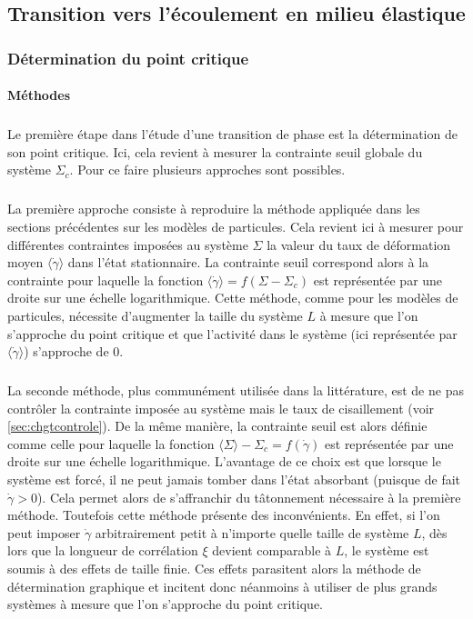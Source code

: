 \subsection{Transition vers l'écoulement en milieu élastique}

\subsubsection{Détermination du point critique}

\label{sec:methodepointcritique}

\paragraph{Méthodes}

\subparagraph{}Le première étape dans l'étude d'une transition de phase est la détermination de son point critique. Ici, cela revient à mesurer la contrainte seuil globale du système $\Sigma_c$. Pour ce faire plusieurs approches sont possibles.

\subparagraph{}La première approche consiste à reproduire la méthode appliquée dans les sections précédentes sur les modèles de particules. Cela revient ici à mesurer pour différentes contraintes imposées au système $\Sigma$ la valeur du taux de déformation moyen $\langle \dot{\gamma}\rangle$ dans l'état stationnaire. La contrainte seuil correspond alors à la contrainte pour laquelle la fonction $\langle \dot{\gamma} \rangle = f(\Sigma-\Sigma_c)$ est représentée par une droite sur une échelle logarithmique. Cette méthode, comme pour les modèles de particules, nécessite d'augmenter la taille du système $L$ à mesure que l'on s'approche du point critique et que l'activité dans le système (ici représentée par $\langle \dot{\gamma}\rangle$) s'approche de $0$.

\subparagraph{}La seconde méthode, plus communément utilisée dans la littérature, est de ne pas contrôler la contrainte imposée au système mais le taux de cisaillement (voir \autoref{sec:chgtcontrole}). De la même manière, la contrainte seuil est alors définie comme celle pour laquelle la fonction $\langle \Sigma \rangle - \Sigma_c = f(\dot{\gamma})$ est représentée par une droite sur une échelle logarithmique. L'avantage de ce choix est que lorsque le système est forcé, il ne peut jamais tomber dans l'état absorbant (puisque de fait $\dot{\gamma}>0$). Cela permet alors de s'affranchir du tâtonnement nécessaire à la première méthode. Toutefois cette méthode présente des inconvénients. En effet, si l'on peut imposer $\dot{\gamma}$ arbitrairement petit à n'importe quelle taille de système $L$, dès lors que la longueur de corrélation $\xi$ devient comparable à $L$, le système est soumis à des effets de taille finie. Ces effets parasitent alors la méthode de détermination graphique et incitent donc néanmoins à utiliser de plus grands systèmes à mesure que l'on s'approche du point critique.

